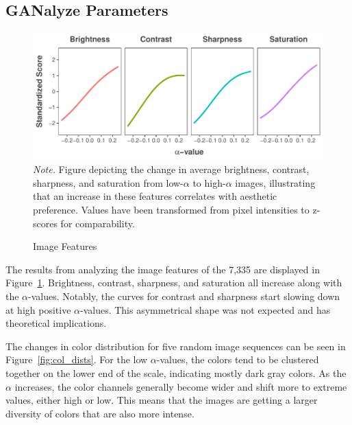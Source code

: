 \documentclass[../main.tex]{subfiles}
\begin{document}
\subsection{GANalyze Parameters}
\begin{figure}[!h]
	\caption{Image Features}
	\label{fig:img_features}
	\includegraphics[width=1\linewidth]{images/results/img_features.pdf}
	{\textit{Note.} Figure depicting the change in average brightness, contrast, sharpness, and saturation from low-$\alpha$ to high-$\alpha$ images, illustrating that an increase in these features correlates with aesthetic preference. Values have been transformed from pixel intensities to z-scores for comparability.}
\end{figure}

The results from analyzing the image features of the 7,335 are displayed in Figure~\ref{fig:img_features}. Brightness, contrast, sharpness, and saturation all increase along with the $\alpha$-values. Notably, the curves for contrast and sharpness start slowing down at high positive $\alpha$-values. This asymmetrical shape was not expected and has theoretical implications.



The changes in color distribution for five random image sequences can be seen in Figure~\ref{fig:col_dists}. For the low $\alpha$-values, the colors tend to be clustered together on the lower end of the scale, indicating mostly dark gray colors. As the $\alpha$ increases, the color channels generally become wider and shift more to extreme values, either high or low. This means that the images are getting a larger diversity of colors that are also more intense.
\end{document}

